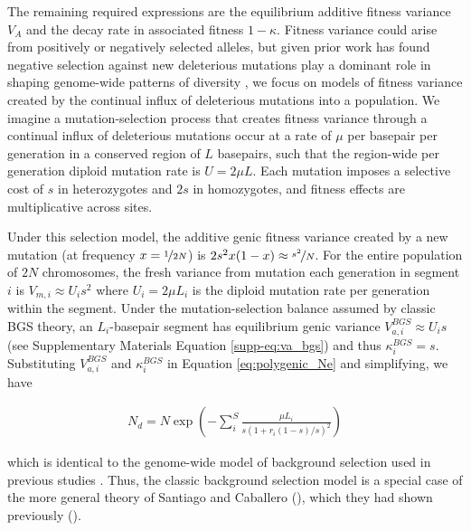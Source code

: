 \documentclass[11pt]{article}
\begin{document}
The remaining required expressions are the equilibrium additive fitness
variance $V_A$ and the decay rate in associated fitness $1-\kappa$. Fitness
variance could arise from positively or negatively selected alleles, but given
prior work has found negative selection against new deleterious mutations play
a dominant role in shaping genome-wide patterns of diversity
\parencite{McVicker2009-ax,Murphy2022-sj}, we focus on models of fitness
variance created by the continual influx of deleterious mutations into a
population. We imagine a mutation-selection process that creates fitness
variance through a continual influx of deleterious mutations occur at a rate of
$\mu$ per basepair per generation in a conserved region of $L$ basepairs, such
that the region-wide per generation diploid mutation rate is $U = 2 \mu L$.
Each mutation imposes a selective cost of $s$ in heterozygotes and $2s$ in
homozygotes, and fitness effects are multiplicative across sites. 

Under this selection model, the additive genic fitness variance created by a
new mutation (at frequency $x=\nicefrac{1}{2N}$) is $2s^2 x(1-x) \approx
\nicefrac{s^2}{N}$. For the entire population of $2N$ chromosomes, the fresh
variance from mutation each generation in segment $i$ is $V_{m,i} \approx
U_is^2$ where $U_i = 2\mu L_i$ is the diploid mutation rate per generation
within the segment. Under the mutation-selection balance assumed by classic BGS
theory, an $L_i$-basepair segment has equilibrium genic variance $V_{a,i}^{BGS}
\approx U_i s$ (see Supplementary Materials Equation \ref{supp-eq:va_bgs}) and
thus $\kappa_i^{BGS} = s$. Substituting $V_{a,i}^{BGS}$ and $\kappa_i^{BGS}$ in
Equation \eqref{eq:polygenic_Ne} and simplifying, we have

\begin{align}
    N_d = N \exp \left( - \sum_i^S \frac{\mu L_i}{s(1 + r_i(1-s)/s)^2} \right) 
\end{align}

which is identical to the genome-wide model of background selection used in
previous studies \parencite{McVicker2009-ax,Elyashiv2016-vt,Murphy2022-sj}.
Thus, the classic background selection model is a special case of the more
general theory of Santiago and Caballero (\citeyear{Santiago2016-mu}), which
they had shown previously (\citeyear{Santiago1998-bs}).
\end{document}
